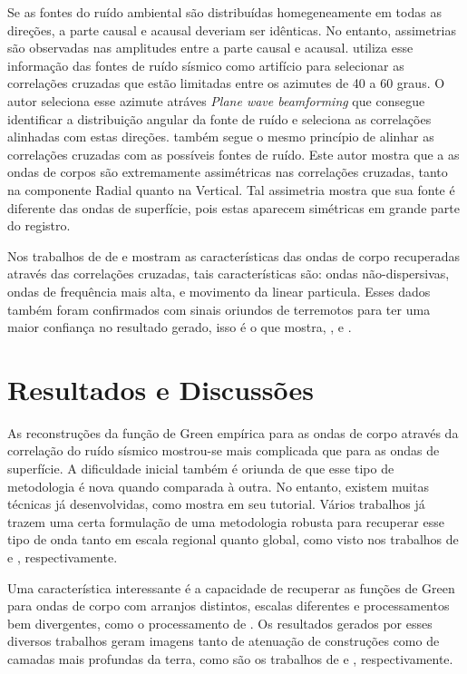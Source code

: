 \documentclass[paper,twocolumn]{geophysics}
\begin{document}
Se as fontes do ruído ambiental são distribuídas homegeneamente em todas as direções, a parte causal e acausal deveriam ser idênticas. No entanto, assimetrias são observadas nas amplitudes entre a parte causal e acausal. \cite{roux_p-waves_2005} utiliza esse informação das fontes de ruído sísmico como artifício para selecionar as correlações cruzadas que estão limitadas entre os azimutes de 40 a 60 graus. O autor seleciona esse azimute atráves \textit{Plane wave beamforming} que consegue identificar a distribuição angular da fonte de ruído e seleciona as correlações alinhadas com estas direções. \cite{poli_emergence_2012} também segue o mesmo princípio de alinhar as correlações cruzadas com as possíveis fontes de ruído. Este autor mostra que a as ondas de corpos são extremamente assimétricas nas correlações cruzadas, tanto na componente Radial quanto na Vertical. Tal assimetria mostra que sua fonte é diferente das ondas de superfície, pois estas aparecem simétricas em grande parte do registro. 

Nos trabalhos de de \cite{roux_p-waves_2005}e \cite{poli_emergence_2012} mostram as características das ondas de corpo recuperadas através das correlações cruzadas, tais características são: ondas não-dispersivas, ondas de frequência mais alta, e movimento da linear particula. Esses dados também foram confirmados com sinais oriundos de terremotos para ter uma maior confiança no resultado gerado, isso é o que mostra, \cite{prieto_amplitude_2011}, \citep{poli_emergence_2012} e \citep{boue_teleseismic_2013}. 

\section*{Resultados e Discussões}

As reconstruções da função de Green empírica para as ondas de corpo através da correlação do ruído sísmico mostrou-se mais complicada que para as ondas de superfície. A dificuldade inicial também é oriunda de que esse tipo de metodologia é nova quando comparada à outra. No entanto, existem muitas técnicas já desenvolvidas, como mostra \cite{wapenaar_tutorial_2010} em seu tutorial. Vários trabalhos já trazem uma certa formulação de uma metodologia robusta para recuperar esse tipo de onda tanto em escala regional quanto global, como visto nos trabalhos de \cite{roux_p-waves_2005} e \cite{boue_teleseismic_2013}, respectivamente.

Uma característica interessante é a capacidade de recuperar as funções de Green para ondas de corpo com arranjos distintos, escalas diferentes e processamentos bem divergentes, como o processamento de \cite{prieto_amplitude_2011}. Os resultados gerados por esses diversos trabalhos geram imagens tanto de atenuação de construções como de camadas mais profundas da terra, como são os trabalhos de \cite{prieto_amplitude_2011} e \cite{boue_teleseismic_2013}, respectivamente.
\end{document}
